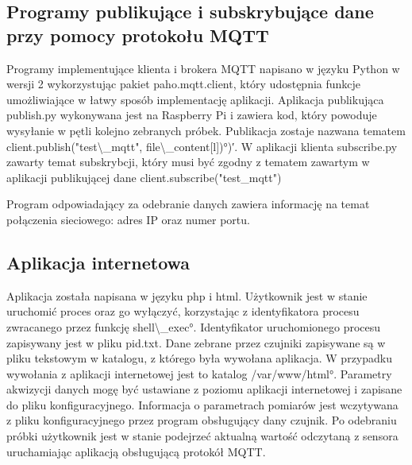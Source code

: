 \subsection{Programy publikujące i subskrybujące dane przy pomocy protokołu MQTT}

Programy implementujące klienta i brokera MQTT napisano w języku Python w wersji 2 wykorzystując pakiet paho.mqtt.client, który udostępnia funkcje umożliwiające w łatwy sposób implementację aplikacji. 
Aplikacja publikująca publish.py wykonywana jest na Raspberry Pi i zawiera kod, który powoduje wysyłanie w pętli kolejno zebranych próbek. Publikacja zostaje nazwana tematem 
\ang{client.publish("test\_mqtt", file\_content[l]);)}.
W aplikacji klienta subscribe.py zawarty temat subskrybcji, który musi być zgodny z tematem zawartym w aplikacji publikującej dane\cite{paho.mqtt}
client.subscribe("test\_mqtt")

Program odpowiadający za odebranie danych zawiera informację na temat połączenia sieciowego: adres IP oraz numer portu.

\subsection{Aplikacja internetowa}

Aplikacja została napisana w języku php i html. Użytkownik jest w stanie uruchomić proces oraz go wyłączyć, korzystając z identyfikatora procesu zwracanego przez funkcję  \ang{shell\_exec}. Identyfikator uruchomionego procesu zapisywany jest w pliku pid.txt. Dane zebrane przez czujniki zapisywane są w pliku tekstowym w katalogu, z którego była wywołana aplikacja. W przypadku wywołania z aplikacji internetowej jest to katalog \ang{/var/www/html}. Parametry akwizycji danych mogę być ustawiane z poziomu aplikacji internetowej i zapisane do pliku konfiguracyjnego. Informacja o parametrach pomiarów jest wczytywana z pliku konfiguracyjnego przez program obsługujący dany czujnik. Po odebraniu próbki użytkownik jest w stanie podejrzeć aktualną wartość odczytaną z sensora uruchamiając aplikacją obsługującą protokół MQTT. 

